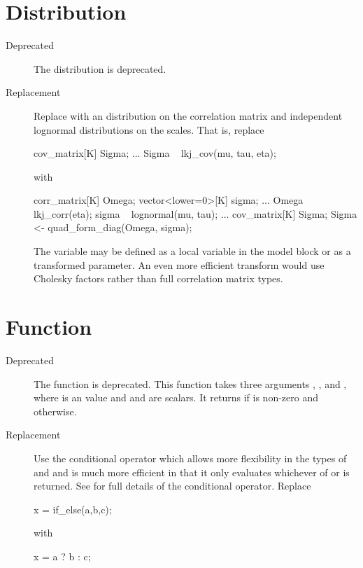 \section{ Distribution}

\begin{description}
\item[Deprecated]The distribution  is deprecated.
\item[Replacement] Replace  with an
   distribution on the correlation matrix and
  independent lognormal distributions on the scales.  That is,
  replace
\begin{stancode}
cov_matrix[K] Sigma;
...
Sigma ~ lkj_cov(mu, tau, eta);
\end{stancode}
  with
\begin{stancode}
corr_matrix[K] Omega;
vector<lower=0>[K] sigma;
...
Omega ~ lkj_corr(eta);
sigma ~ lognormal(mu, tau);
...
cov_matrix[K] Sigma;
Sigma <- quad_form_diag(Omega, sigma);
\end{stancode}
The variable  may be defined as a local variable in the
model block or as a transformed parameter.  An even more efficient
transform would use Cholesky factors rather than full correlation
matrix types.
\end{description}

\section{ Function}

\begin{description}
\item[Deprecated]The function  is deprecated.  This
  function takes three arguments , , and ,
  where  is an  value and  and  are
  scalars. It returns  if  is non-zero and 
  otherwise.
%
\item[Replacement] Use the conditional operator which allows more
  flexibility in the types of  and  and is much more
  efficient in that it only evaluates whichever of  or
   is returned.  See  for
  full details of the conditional operator.  Replace
\begin{stancode}
x = if_else(a,b,c);
\end{stancode}
 with
\begin{stancode}
x = a ? b : c;
\end{stancode}
\end{description}

